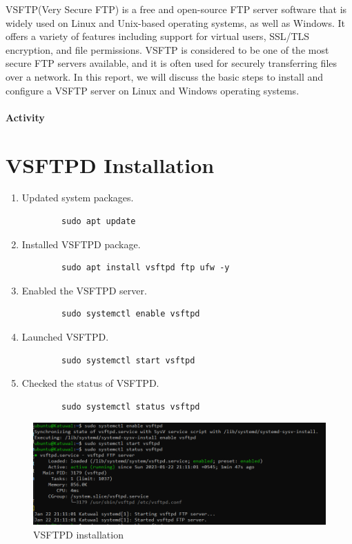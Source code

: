 \documentclass[12pt]{article}
\begin{document}
VSFTP(Very Secure FTP) is a free and open-source FTP server software 
that is widely used on Linux and Unix-based operating systems, as well 
as Windows. 
It offers a variety of features including support for virtual users, 
SSL/TLS encryption, and file permissions. VSFTP is considered to be 
one of the most secure FTP servers available, and it is often used 
for securely transferring files over a network. In this report, 
we will discuss the basic steps to install and configure a VSFTP 
server on Linux and Windows operating systems.

\paragraph{Activity}
\section{VSFTPD Installation}
\begin{enumerate}
    \item Updated system packages.
    \begin{verbatim}
        sudo apt update
    \end{verbatim}
    \item Installed VSFTPD package.
    \begin{verbatim}
        sudo apt install vsftpd ftp ufw -y 
    \end{verbatim}
    \item Enabled the VSFTPD server.
    \begin{verbatim}
        sudo systemctl enable vsftpd
    \end{verbatim}
    \item Launched VSFTPD.
    \begin{verbatim}
        sudo systemctl start vsftpd
    \end{verbatim}
    \item Checked the status of VSFTPD.
    \begin{verbatim}
        sudo systemctl status vsftpd
    \end{verbatim}
\end{enumerate}
\begin{figure}
    \centering
    \includegraphics[scale = 0.70]{Images/Setup.PNG}
    \caption{VSFTPD installation}
\end{figure}
\end{document}
